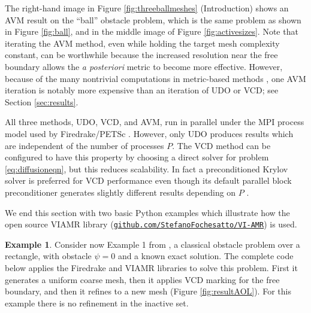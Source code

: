 \documentclass[]{interact}
\theoremstyle{plain}%
\theoremstyle{definition}
\newtheorem{example}[theorem]{Example}
\theoremstyle{remark}
\begin{document}
The right-hand image in Figure \ref{fig:threeballmeshes} (Introduction) shows an AVM result on the ``ball'' obstacle problem, which is the same problem as shown in Figure \ref{fig:ball}, and in the middle image of Figure \ref{fig:activesizes}.  Note that iterating the AVM method, even while holding the target mesh complexity constant, can be worthwhile because the increased resolution near the free boundary allows the \emph{a posteriori} metric to become more effective.  However, because of the many nontrivial computations in metric-based methods \cite{Alauzet2010,Wallworketal2020}, one AVM iteration is notably more expensive than an iteration of UDO or VCD; see Section \ref{sec:results}.

All three methods, UDO, VCD, and AVM, run in parallel under the MPI process model used by Firedrake/PETSc \cite{Bueler2021,Langeetal2016}.  However, only UDO produces results which are independent of the number of processes $P$.  The VCD method can be configured to have this property by choosing a direct solver for problem \eqref{eq:diffusioneqn}, but this reduces scalability.  In fact a preconditioned Krylov solver is preferred for VCD performance even though its default parallel block preconditioner generates slightly different results depending on $P$ \cite{Bueler2021}.

We end this section with two basic Python examples which illustrate how the open source VIAMR library (\href{https://github.com/StefanoFochesatto/VI-AMR}{{\small \texttt{github.com/StefanoFochesatto/VI-AMR}}}) is used.

\begin{example} \label{example:AOL}
Consider now Example 1 from \cite{AinsworthOdenLee1993}, a classical obstacle problem over a rectangle, with obstacle $\psi=0$ and a known exact solution.  The complete code below applies the Firedrake and VIAMR libraries to solve this problem.  First it generates a uniform coarse mesh, then it applies VCD marking for the free boundary, and then it refines to a new mesh (Figure \ref{fig:resultAOL}).  For this example there is no refinement in the inactive set.
\inputminted[linenos, frame=lines]{python}{../examples/aol.py}
\end{example}
\end{document}
